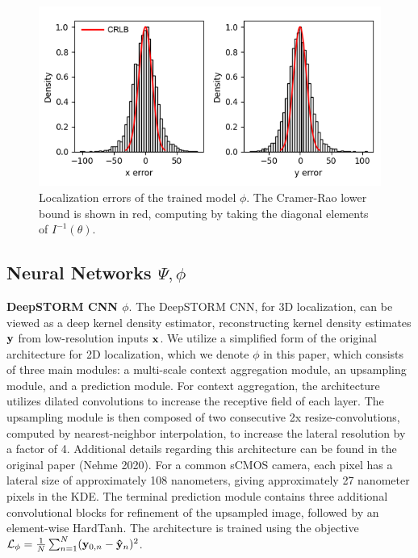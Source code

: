 \documentclass{article}
\begin{document}
\begin{figure}
\centering
\includegraphics[scale=0.7]{Errors.png}
\caption{Localization errors of the trained model $\phi$. The Cramer-Rao lower bound is shown in red, computing by taking the diagonal elements of $I^{-1}(\theta)$.}
\end{figure}


\subsection{Neural Networks $\Psi,\phi$}

\textbf{DeepSTORM CNN $\phi$}. The DeepSTORM CNN, for 3D localization, can be viewed as a deep kernel density estimator, reconstructing kernel density estimates $\bold{y}$ from low-resolution inputs $\bold{x}$. We utilize a simplified form of the original architecture for 2D localization, which we denote $\phi$ in this paper, which consists of three main modules: a multi-scale context aggregation module, an upsampling module, and a prediction module. For context aggregation, the architecture utilizes dilated convolutions to increase the receptive field of each layer. The upsampling module is then composed of two consecutive 2x resize-convolutions, computed by nearest-neighbor interpolation, to increase the lateral resolution by a factor of 4. Additional details regarding this architecture can be found in the original paper (Nehme 2020). For a common sCMOS camera, each pixel has a lateral size of approximately 108 nanometers, giving approximately 27 nanometer pixels in the KDE. The terminal prediction module contains three additional convolutional blocks for refinement of the upsampled image, followed by an element-wise HardTanh. The architecture is trained using the objective $\mathcal{L}_{\phi} = \frac{1}{N}\sum_{n=1}^{N} (\bold{y}_{0,n}-\bold{\hat{y}}_{n})^{2}$. 
\end{document}
